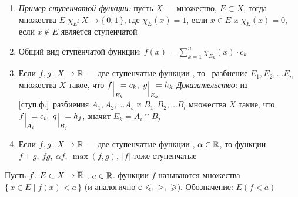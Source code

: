 \begin{zam}[https://www.youtube.com/live/D_Nn53jVQxE?si=TLomW6CsIG2IkY16&t=7983]\begin{enumerate}\makeatletter\renewcommand{\p@enumi}{\thezam.}\makeatother
	\item\label{характ.функц.} \textit{Пример ступенчатой функции:} пусть $X$ --- множество, $E \subset X$, тогда   множества $E$ $\chi_E  \colon X \to \{\,0, 1\,\}$, где $\chi_E(x) = 1$, если $x \in E$ и $\chi_E(x) = 0$, если $x \notin E$ является ступенчатой 
	
	\item Общий вид ступенчатой функции:  $f(x) = \sum\limits_{k = 1}^n \chi_{E_k} (x) \cdot c_k$ 
	
	\item Если $f, g \colon X \to \mathbb R$ --- две ступенчатые функции , то\E\  разбиение $E_1, E_2, \ldots E_n$ множества $X$ такое, что  $f \su{E_k} =  c_k,\ g\su{E_k} = h_k$ \linebreak \textit{Доказательство:} из \ref{ступ.ф.}\E\ разбиения $A_1, A_2, \ldots A_s$ и $B_1, B_2, \ldots B_l$ множества $X$ такие, что  $f \su{A_i} = c_i,\ g\su{B_j} = h_j$, значит $E_k = A_i \cap B_j$ 
	
	\item\label{произв.ступ.} Если $f, g \colon X \to \mathbb R$ --- две ступенчатые функции , $\alpha \in \mathbb R$, то функции $f + g,\ fg,\ \alpha f,\ \max(f, g),\ |f|$ тоже ступенчатые 
\end{enumerate}\end{zam}

\begin{opr}\label{лебег.мн.}
	\!Пусть $f \colon E \subset X \to \overline {\mathbb R}$ , $a \in \mathbb R$.\! \! функции $f$ называются множества \!$\{\, x \in E \mid f(x) < a\,\}$ \!(и аналогично с $\<,\ >,\ \biger$).\! Обозначение: $E(f < a)$
\end{opr}


